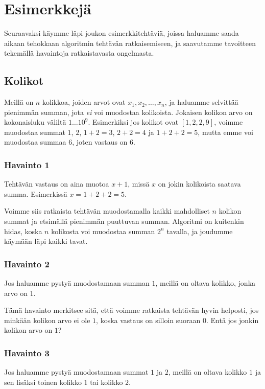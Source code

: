 \section{Esimerkkejä}

Seuraavaksi käymme läpi joukon esimerkkitehtäviä,
joissa haluamme saada aikaan tehokkaan algoritmin tehtävän ratkaisemiseen,
ja saavutamme tavoitteen tekemällä havaintoja ratkaistavasta ongelmasta.

\subsection{Kolikot}

Meillä on $n$ kolikkoa, joiden arvot ovat $x_1,x_2,\dots,x_n$,
ja haluamme selvittää pienimmän summan, jota \emph{ei} voi muodostaa kolikoista.
Jokaisen kolikon arvo on kokonaisluku väliltä $1 \dots 10^9$.
Esimerkiksi jos kolikot ovat $[1,2,2,9]$, voimme muodostaa summat
$1$, $2$, $1+2=3$, $2+2=4$ ja $1+2+2=5$,
mutta emme voi muodostaa summaa $6$, joten vastaus on $6$.

\subsubsection{Havainto 1}

Tehtävän vastaus on aina muotoa $x+1$, missä $x$ on jokin kolikoista
saatava summa.
Esimerkissä $x=1+2+2=5$.

Voimme siis ratkaista tehtävän
muodostamalla kaikki mahdolliset $n$ kolikon summat
ja etsimällä pienimmän puuttuvan summan.
Algoritmi on kuitenkin hidas, koska $n$ kolikosta voi
muodostaa summan $2^n$ tavalla, ja joudumme käymään läpi kaikki tavat.

\subsubsection{Havainto 2}

Jos haluamme pystyä muodostamaan summan $1$,
meillä on oltava kolikko, jonka arvo on $1$.

Tämä havainto merkitsee sitä, että voimme ratkaista tehtävän
hyvin helposti, jos minkään kolikon arvo ei ole $1$,
koska vastaus on silloin suoraan $0$.
Entä jos jonkin kolikon arvo on $1$?

\subsubsection{Havainto 3}

Jos haluamme pystyä muodostamaan summat $1$ ja $2$,
meillä on oltava kolikko $1$ ja sen lisäksi
toinen kolikko $1$ tai kolikko $2$.

